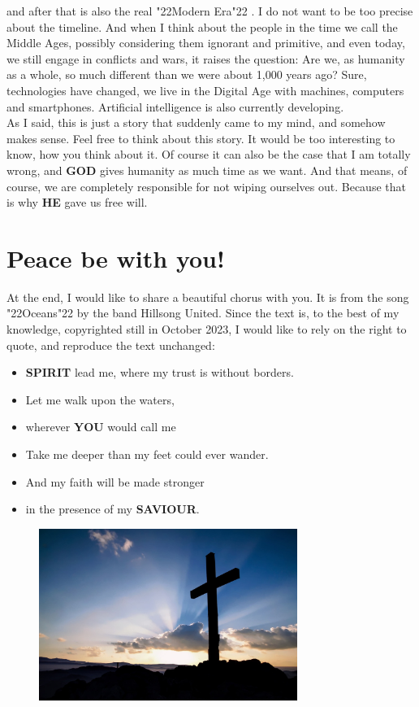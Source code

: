 \documentclass[10pt,a5paper]{article}
\newcommand{\God}[0]{\textbf{GOD}}
\newcommand{\He}[0]{\textbf{HE}}
\newcommand{\Saviour}[0]{\textbf{SAVIOUR}}
\newcommand{\Spirit}[0]{\textbf{SPIRIT}}
\newcommand{\You}[0]{\textbf{YOU}}
\newcommand{\q}[1]{\char"22{#1}\char"22 }
\begin{document}
		and after that is also the real \q{Modern Era}.
		I do not want to be too precise about the timeline.
		And when I think about the people in the time we call the Middle Ages,
		possibly considering them ignorant and primitive,
		and even today,
		we still engage in conflicts and wars,
		it raises the question:
		Are we,
		as humanity as a whole,
		so much different than we were about 1,000 years ago?
		Sure,
		technologies have changed,
		we live in the Digital Age with machines,
		computers and smartphones.
		Artificial intelligence is also currently developing.
		\\
		As I said,
		this is just a story that suddenly came to my mind,
		and somehow makes sense.
		Feel free to think about this story.
		It would be too interesting to know,
		how you think about it.
		Of course it can also be the case that I am totally wrong,
		and {\God} gives humanity as much time as we want.
		And that means,
		of course,
		we are completely responsible for not wiping ourselves out.
		Because that is why {\He} gave us free will.

	\newpage
	\section{Peace be with you!}
		At the end,
		I would like to share a beautiful chorus with you.
		It is from the song \q{Oceans} by the band Hillsong United.
		Since the text is,
		to the best of my knowledge,
		copyrighted still in October 2023,
		I would like to rely on the right to quote,
		and reproduce the text unchanged:
		\\	
		\begin{itemize}[nosep]
			\item[]	{\Spirit} lead me,
			where my trust is without borders.
			\item[] Let me walk upon the waters,
			\item[] wherever {\You} would call me
			\item[]	Take me deeper than my feet could ever wander.
			\item[]	And my faith will be made stronger
			\item[]	in the presence of my {\Saviour}.
			\\
		\end{itemize}
		\begin{figure}[h]
			\centering
			\includegraphics[width=0.75\textwidth,keepaspectratio]{"FreeChristian.jpeg"}
		\end{figure}
	
\end{document}

